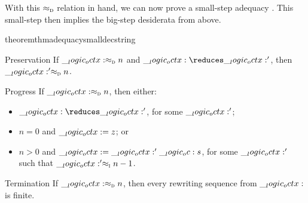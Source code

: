 
%







With this $ \approx\sb{\text{\normalfont\scshape d}} $ relation in hand, we can now prove a small-step adequacy .
This small-step  then implies the big-step desiderata from above.
%
\begin{restatable}[
  name=Small-step adequacy of decrements,
  label=thm:string-rewriting:dec-small-step-adequacy
]{theorem}{thmadequacysmalldecstring}
  \leavevmode
  \begin{thinthmdescription}[leftmargin=0em]
  \item[Preservation]
    If $\__logic_octx: \approx\sb{\text{\normalfont\scshape d}} n$ and $\octx \reduces \octx'$, then $\__logic_octx:' \approx\sb{\text{\normalfont\scshape d}} n$.
  \item[Progress]
    If $\__logic_octx: \approx\sb{\text{\normalfont\scshape d}} n$, then either:
    \begin{itemize}[nosep]
    \item $\octx \reduces \octx'$, for some $\__logic_octx:'$;
    \item $n = 0$ and $\__logic_octx: = z$; or
    \item $n > 0$ and $\__logic_octx: = \__logic_octx:' \__logic_oc: s$, for some $\__logic_octx:'$ such that $\__logic_octx:' \approx\sb{\text{\normalfont\scshape i}} n-1$.
    \end{itemize}
  \item[Termination]
    If $\__logic_octx: \approx\sb{\text{\normalfont\scshape d}} n$, then every rewriting sequence from $\__logic_octx:$ is finite.
  \end{thinthmdescription}
\end{restatable}

